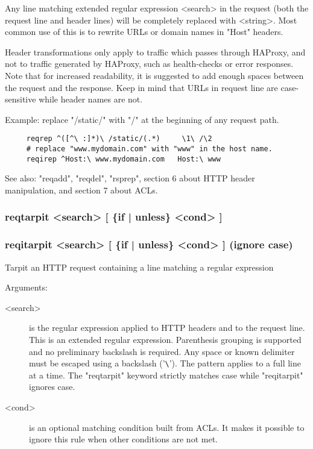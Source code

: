  Any line matching extended regular expression <search> in the request (both
  the request line and header lines) will be completely replaced with <string>.
  Most common use of this is to rewrite URLs or domain names in "Host" headers.

  Header transformations only apply to traffic which passes through HAProxy,
  and not to traffic generated by HAProxy, such as health-checks or error
  responses. Note that for increased readability, it is suggested to add enough
  spaces between the request and the response. Keep in mind that URLs in
  request line are case-sensitive while header names are not.

  Example: replace "/static/" with "/" at the beginning of any request path.
  \begin{verbatim}
     reqrep ^([^\ :]*)\ /static/(.*)     \1\ /\2
     # replace "www.mydomain.com" with "www" in the host name.
     reqirep ^Host:\ www.mydomain.com   Host:\ www
  \end{verbatim}

  See also: "reqadd", "reqdel", "rsprep", section 6 about HTTP header
            manipulation, and section 7 about ACLs.

\subsubsection[reqtarpit]{reqtarpit  <search> [ \{if | unless\} <cond> ]}
\subsubsection[reqitarpit]{reqitarpit <search> [ \{if | unless\} <cond> ]  (ignore case)}


  Tarpit an HTTP request containing a line matching a regular expression


  Arguments:
  \begin{description}
  \item[<search>] is the regular expression applied to HTTP headers and to the
              request line. This is an extended regular expression. Parenthesis
              grouping is supported and no preliminary backslash is required.
              Any space or known delimiter must be escaped using a backslash
              ('\verb|\|'). The pattern applies to a full line at a time. The
              "reqtarpit" keyword strictly matches case while "reqitarpit"
              ignores case.

  \item[<cond>] is an optional matching condition built from ACLs. It makes it
              possible to ignore this rule when other conditions are not met.
  \end{description}

